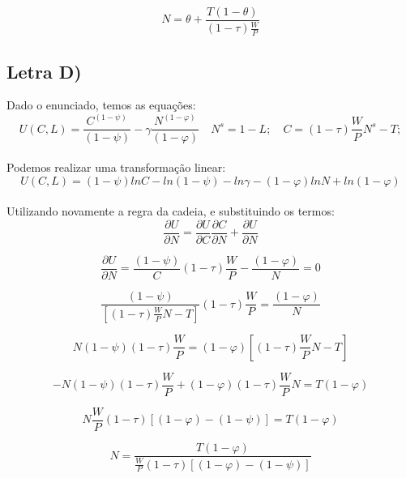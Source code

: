 \documentclass{article}
\begin{document}
\begin{equation}
N = \theta + \frac{T(1-\theta)}{(1-\tau)\frac{W}{P}}
\end{equation}

\clearpage

\subsection*{Letra D)}
Dado o enunciado, temos as equações: 
$$U(C, L) = \frac{C^{(1-\psi)}}{(1-\psi)} - \gamma \frac{N^{(1-\varphi)}}{(1-\varphi)} \quad
N^{s} = 1 - L; \quad
C = (1-\tau)\frac{W}{P}N^s - T;$$
\\
Podemos realizar uma transformação linear:
$$ U(C,L) = (1-\psi) ln C - ln(1-\psi) - ln \gamma - (1-\varphi) ln N + ln (1-\varphi) $$
\\
Utilizando novamente a regra da cadeia, e substituindo os termos:
\begin{equation}
\frac{\partial U}{\partial N}= \frac{\partial U}{\partial C}\frac{\partial C}{\partial N} + \frac{\partial U}{\partial N}
\end{equation}

\begin{equation}
\frac{\partial U}{\partial N}= \frac{(1-\psi)}{C}(1-\tau)\frac{W}{P} - \frac{(1-\varphi)}{N} = 0
\end{equation}

\begin{equation}
\frac{(1-\psi)}{[(1-\tau)\frac{W}{P}N-T]}(1-\tau)\frac{W}{P} = \frac{(1-\varphi)}{N}
\end{equation}

\begin{equation}
N(1-\psi)(1-\tau)\frac{W}{P} = (1-\varphi)[(1-\tau)\frac{W}{P}N-T]
\end{equation}

\begin{equation}
- N(1-\psi)(1-\tau)\frac{W}{P} + (1-\varphi)(1-\tau)\frac{W}{P}N = T(1-\varphi)
\end{equation}

\begin{equation}
N \frac{W}{P}(1-\tau)[(1-\varphi)-(1-\psi)] = T(1-\varphi)
\end{equation}

\begin{equation}
N = \frac{T(1-\varphi)}{\frac{W}{P}(1-\tau)[(1-\varphi)-(1-\psi)]}
\end{equation}

\clearpage
\end{document}
